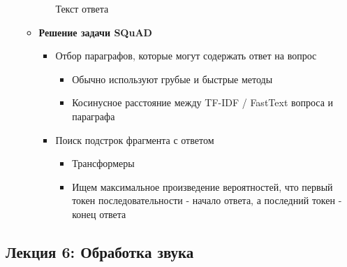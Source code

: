 \documentclass[a4paper, 12pt]{article}
\begin{document}
\begin{itemize}
\begin{itemize}
\begin{itemize}
      Текст ответа
      
    \end{itemize}
  \item
    
    \textbf{Решение задачи SQuAD}
    

    \begin{itemize}
    \item
      
      Отбор параграфов, которые могут содержать ответ на вопрос
      

      \begin{itemize}
      \item
        
        Обычно используют грубые и быстрые методы
        

      \item
        
        Косинусное расстояние между TF-IDF / FastText вопроса и
        параграфа
          
      \end{itemize}
    \item
      
      Поиск подстрок фрагмента с ответом
      

      \begin{itemize}
      \item
        
        Трансформеры
        
      \item
        
        Ищем максимальное произведение вероятностей, что первый токен
        последовательности - начало ответа, а последний токен - конец
        ответа
        
      \end{itemize}
    \end{itemize}
  \end{itemize}
\end{itemize}

\subsection{Лекция 6: Обработка звука}
\end{document}
